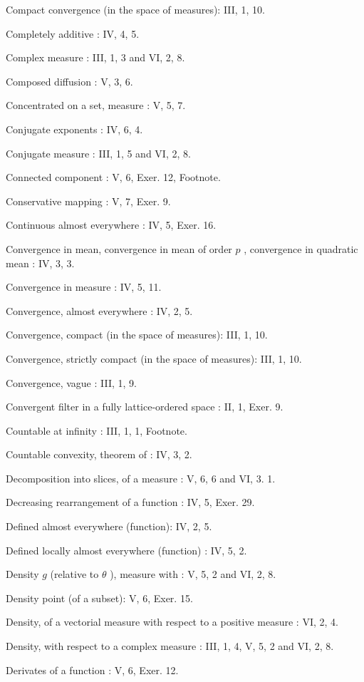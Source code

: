 Compact convergence (in the space of measures): III, 1, 10.

Completely additive : IV, 4, 5.

Complex measure : III, 1, 3 and VI, 2, 8.

Composed diffusion : V, 3, 6.

Concentrated on a set, measure : V, 5, 7.

Conjugate exponents : IV, 6, 4.

Conjugate measure : III, 1, 5 and VI, 2, 8.

Connected component : V, 6, Exer. 12, Footnote.

Conservative mapping : V, 7, Exer. 9.

Continuous almost everywhere : IV, 5, Exer. 16.

Convergence in mean, convergence in mean of order \(p\) , convergence in quadratic mean : IV, 3, 3.

Convergence in measure : IV, 5, 11.

Convergence, almost everywhere : IV, 2, 5.

Convergence, compact (in the space of measures): III, 1, 10.

Convergence, strictly compact (in the space of measures): III, 1, 10.

Convergence, vague : III, 1, 9.

Convergent filter in a fully lattice-ordered space : II, 1, Exer. 9.

Countable at infinity : III, 1, 1, Footnote.

Countable convexity, theorem of : IV, 3, 2.

Decomposition into slices, of a measure : V, 6, 6 and VI, 3. 1.

Decreasing rearrangement of a function : IV, 5, Exer. 29.

Defined almost everywhere (function): IV, 2, 5.

Defined locally almost everywhere (function) : IV, 5, 2.

Density \(g\) (relative to \(\theta\) ), measure with : V, 5, 2 and VI, 2, 8.

Density point (of a subset): V, 6, Exer. 15.

Density, of a vectorial measure with respect to a positive measure : VI, 2, 4.

Density, with respect to a complex measure : III, 1, 4, V, 5, 2 and VI, 2, 8.

Derivates of a function : V, 6, Exer. 12.


